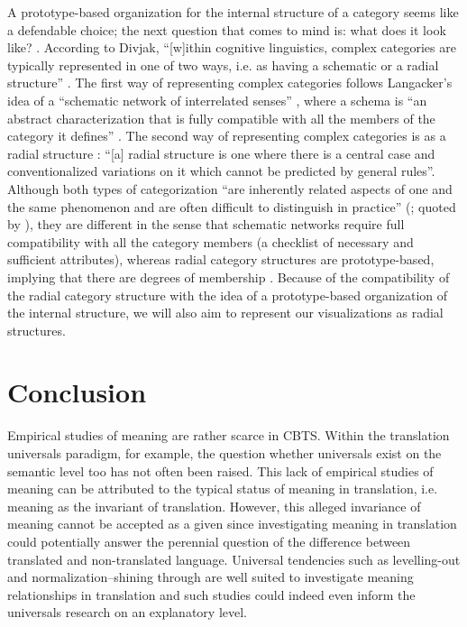 A prototype-based organization for the internal structure of a category seems like a defendable choice; the next question that comes to mind is: what does it look like? \citep[149]{divjak_structuring_2010}. According to Divjak, “[w]ithin cognitive linguistics, complex categories are typically represented in one of two ways, i.e. as having a schematic or a radial structure” \citep[149]{divjak_structuring_2010}. The first way of representing complex categories follows Langacker’s idea of a “schematic network of interrelated senses” \citep[369,  371]{langacker_foundations_1987}, where a schema is “an abstract characterization that is fully compatible with all the members of the category it defines” \citep[149]{divjak_structuring_2010}. The second way of representing complex categories is as a radial structure \citep[84]{lakoff_women_1987}: “[a] radial structure is one where there is a central case and conventionalized variations on it which cannot be predicted by general rules”. Although both types of categorization “are inherently related aspects of one and the same phenomenon and are often difficult to distinguish in practice” (\citealt[371ff.]{langacker_foundations_1987}; quoted by \citealt[149]{divjak_structuring_2010}), they are different in the sense that schematic networks require full compatibility with all the category members (a checklist of necessary and sufficient attributes), whereas radial category structures are prototype-based, implying that there are degrees of membership \citep[150]{divjak_structuring_2010}. Because of the compatibility of the radial category structure with the idea of a prototype-based organization of the internal structure, we will also aim to represent our visualizations as radial structures.

\section{Conclusion}
\label{sec:2.5}  
Empirical studies of meaning are rather scarce in CBTS. Within the translation universals paradigm, for example, the question whether universals exist on the semantic level too has not often been raised. This lack of empirical studies of meaning can be attributed to the typical status of meaning in translation, i.e. meaning as the invariant of translation. However, this alleged invariance of meaning cannot be accepted as a given since investigating meaning in translation could potentially answer the perennial question of the difference between translated and non-translated language. Universal tendencies such as levelling-out and normalization--shining through are well suited to investigate meaning relationships in translation and such studies could indeed even inform the universals research on an explanatory level.


